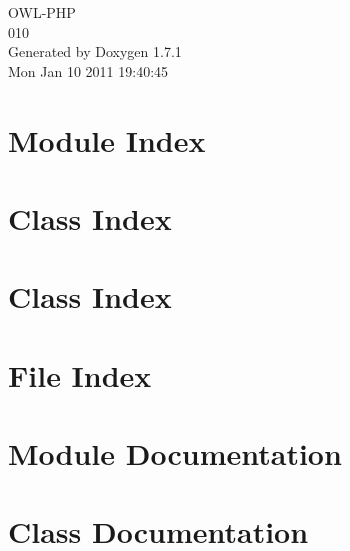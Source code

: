 \documentclass[a4paper]{book}
\begin{document}
\begin{titlepage}
\vspace*{7cm}
\begin{center}
{\Large OWL-\/PHP \\[1ex]\large 010 }\\
\vspace*{1cm}
{\large Generated by Doxygen 1.7.1}\\
\vspace*{0.5cm}
{\small Mon Jan 10 2011 19:40:45}\\
\end{center}
\end{titlepage}
\clearemptydoublepage
{}
\tableofcontents
\clearemptydoublepage
{}
\chapter{Module Index}

\chapter{Class Index}

\chapter{Class Index}

\chapter{File Index}

\chapter{Module Documentation}




\chapter{Class Documentation}


































\end{document}
